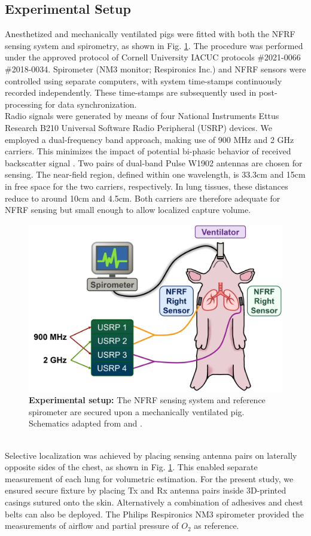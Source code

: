 \documentclass[journal]{IEEEtran}
\begin{document}
\subsection{Experimental Setup}
Anesthetized and mechanically ventilated pigs were fitted with both the NFRF sensing system and spirometry, as shown in Fig. \ref{fig:setup}. The procedure was performed under the approved protocol of Cornell University IACUC protocols \#2021-0066 \#2018-0034. Spirometer (NM3 monitor; Respironics Inc.) and NFRF sensors were controlled using separate computers, with system time-stamps continuously recorded independently. These time-stamps are subsequently used in post-processing for data synchronization. \\
Radio signals were generated by means of four National Instruments Ettus Research B210 Universal Software Radio Peripheral (USRP) devices. We employed a dual-frequency band approach, making use of 900 MHz and 2 GHz carriers. This minimizes the impact of potential bi-phasic behavior of received backscatter signal \cite{zhouBackscatterFieldModel2023}. Two pairs of dual-band Pulse W1902 antennas are chosen for sensing. The near-field region, defined within one wavelength, is 33.3cm and 15cm in free space for the two carriers, respectively. In lung tissues, these distances reduce to around 10cm and 4.5cm. Both carriers are therefore adequate for NFRF sensing but small enough to allow localized capture volume. 
\begin{figure}[htbp]
\centering
\includegraphics[width=.49\textwidth]{setup_v4.jpg}
\caption{\textbf{Experimental setup:} The NFRF sensing system and reference spirometer are secured upon a mechanically ventilated pig. Schematics adapted from \cite{lungImage} and \cite{heartMonitor}.}
\label{fig:setup}
\end{figure}
\\Selective localization was achieved by placing sensing antenna pairs on laterally opposite sides of the chest, as shown in Fig. \ref{fig:setup}. This enabled separate measurement of each lung for volumetric estimation. For the present study, we ensured secure fixture by placing Tx and Rx antenna pairs inside 3D-printed casings sutured onto the skin. Alternatively a combination of adhesives and chest belts can also be deployed. The Philips Respironics NM3 spirometer provided the measurements of airflow and partial pressure of $O_{2}$ as reference. 
\end{document}
